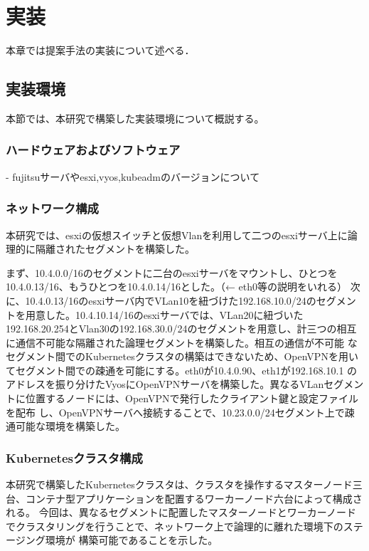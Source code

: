 \chapter{実装}
\label{implementation}

本章では提案手法の実装について述べる．

\section{実装環境}
\label{implementation:environment}
本節では、本研究で構築した実装環境について概説する。

\subsection{ハードウェアおよびソフトウェア}
\label{implementation:environment:resouces}
- fujitsuサーバやesxi,vyos,kubeadmのバージョンについて

\subsection{ネットワーク構成}
\label{implementation:environment:network}
本研究では、esxiの仮想スイッチと仮想Vlanを利用して二つのesxiサーバ上に論理的に隔離されたセグメントを構築した。

まず、10.4.0.0/16のセグメントに二台のesxiサーバをマウントし、ひとつを10.4.0.13/16、もうひとつを10.4.0.14/16とした。（← eth0等の説明をいれる）
次に、10.4.0.13/16のesxiサーバ内でVLan10を紐づけた192.168.10.0/24のセグメントを用意した。10.4.10.14/16のesxiサーバでは、VLan20に紐づいた
192.168.20.254とVlan30の192.168.30.0/24のセグメントを用意し、計三つの相互に通信不可能な隔離された論理セグメントを構築した。相互の通信が不可能
なセグメント間でのKubernetesクラスタの構築はできないため、OpenVPNを用いてセグメント間での疎通を可能にする。eth0が10.4.0.90、eth1が192.168.10.1
のアドレスを振り分けたVyosにOpenVPNサーバを構築した。異なるVLanセグメントに位置するノードには、OpenVPNで発行したクライアント鍵と設定ファイルを配布
し、OpenVPNサーバへ接続することで、10.23.0.0/24セグメント上で疎通可能な環境を構築した。

\subsection{Kubernetesクラスタ構成}
\label{implementation:environment:kubernetes}
本研究で構築したKubernetesクラスタは、クラスタを操作するマスターノード三台、コンテナ型アプリケーションを配置するワーカーノード六台によって構成される。
今回は、異なるセグメントに配置したマスターノードとワーカーノードでクラスタリングを行うことで、ネットワーク上で論理的に離れた環境下のステージング環境が
構築可能であることを示した。


